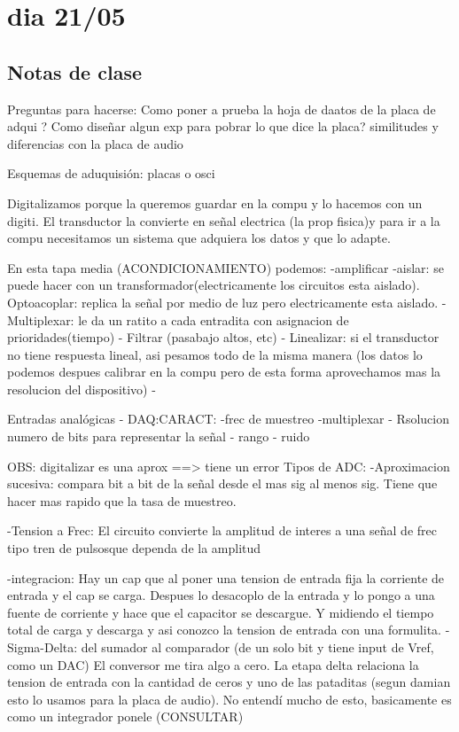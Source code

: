 \documentclass[a4paper,12pt]{article}
\begin{document}
\section{dia 21/05}

\subsection{Notas de clase}
Preguntas para hacerse: Como poner a prueba la hoja de daatos de la placa de adqui ? Como diseñar algun exp para pobrar lo que dice la placa? similitudes y diferencias con la placa de audio 

Esquemas de aduquisión: placas o osci 

Digitalizamos porque la queremos guardar en la compu y lo hacemos con un digiti. El transductor la convierte en señal electrica (la prop fisica)y para ir a la compu necesitamos un sistema que adquiera los datos y que lo adapte. 

En esta tapa media (ACONDICIONAMIENTO) podemos:
-amplificar
-aislar: se puede hacer con un transformador(electricamente los circuitos esta aislado). Optoacoplar: replica la señal por medio de luz pero electricamente esta aislado. 
-Multiplexar: le da un ratito a cada entradita con asignacion de prioridades(tiempo)
- Filtrar (pasabajo altos, etc)
- Linealizar: si el transductor no tiene respuesta lineal, asi pesamos todo de la misma manera (los datos lo podemos despues calibrar en la compu pero de esta forma aprovechamos mas la resolucion del dispositivo)
-


Entradas analógicas - DAQ:CARACT:
-frec de muestreo
-multiplexar 
- Rsolucion numero de bits para representar la señal
- rango
- ruido 

OBS: digitalizar es una aprox ==> tiene un error 
Tipos de ADC: 
-Aproximacion sucesiva: compara bit a bit de la señal desde el mas sig al menos sig. Tiene que hacer mas rapido que la tasa de muestreo. 

-Tension a Frec: El circuito convierte la amplitud de interes a una señal de frec tipo tren de pulsosque dependa de la amplitud 

-integracion: Hay un cap que al poner una tension de entrada fija la corriente de entrada y el cap se carga. Despues lo desacoplo de la entrada y lo pongo a una fuente de corriente y hace que el capacitor se descargue. Y midiendo el tiempo total de carga y descarga y asi conozco la tension de entrada con una formulita. 
- Sigma-Delta: del sumador al comparador (de un solo bit y tiene input de Vref, como un DAC)
El conversor me tira algo a cero.
La etapa delta relaciona la tension de entrada con la cantidad de ceros y uno de las pataditas (segun damian esto lo usamos para la placa de audio). No entendí mucho de esto, basicamente es como un integrador ponele (CONSULTAR)
\end{document}
